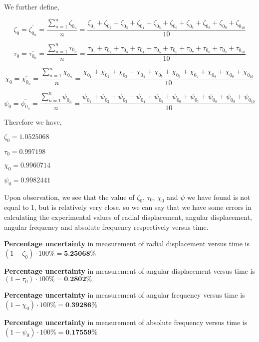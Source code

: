 {We further define,} 

    $$\zeta_0 = \overline{\zeta_{0_n}} = \frac{\sum_{n=1}^{n}\zeta_{0_n}}{n} = \frac{\zeta_{0_1} + \zeta_{0_2} + \zeta_{0_3} + \zeta_{0_4} + \zeta_{0_5} + \zeta_{0_6} + \zeta_{0_7} + \zeta_{0_8} + \zeta_{0_9} + \zeta_{0_{10}}}{10}$$
    
    $$\tau_0 = \overline{\tau_{0_n}} = \frac{\sum_{n=1}^{n}\tau_{0_n}}{n} = \frac{\tau_{0_1} + \tau_{0_2} + \tau_{0_3} + \tau_{0_4} + \tau_{0_5} + \tau_{0_6} + \tau_{0_7} + \tau_{0_8} + \tau_{0_9} + \tau_{0_{10}}}{10}$$
    
    $$\chi_0 = \overline{\chi_{0_n}} = \frac{\sum_{n=1}^{n}\chi_{0_n}}{n} = \frac{\chi_{0_1} + \chi_{0_2} + \chi_{0_3} + \chi_{0_4} + \chi_{0_5} + \chi_{0_6} + \chi_{0_7} + \chi_{0_8} + \chi_{0_9} + \chi_{0_{10}}}{10}$$
    
    $$\psi_0 = \overline{\psi_{0_n}} = \frac{\sum_{n=1}^{n}\psi_{0_n}}{n} = \frac{\psi_{0_1} + \psi_{0_2} + \psi_{0_3} + \psi_{0_4} + \psi_{0_5} + \psi_{0_6} + \psi_{0_7} + \psi_{0_8} + \psi_{0_9} + \psi_{0_{10}}}{10}$$

{Therefore we have,}

    $\zeta_0 = 1.0525068$
    
    $\tau_0 = 0.997198$
    
    $\chi_0 = 0.9960714$
    
    $\psi_0 = 0.9982441$

{Upon observation, we see that the value of $\zeta_0$, $\tau_0$, $\chi_0$ and $\psi$ we have found is not equal to 1, but is relatively very close, so we can say that we have some errors in calculating the experimental values of radial displacement, angular displacement, angular frequency and absolute frequency respectively versus time.}
        
        {\textbf{Percentage uncertainty} in measurement of radial displacement versus time is $(1-\zeta_0)\cdot{100\%}=\textbf{5.25068\%}$}
        
        {\textbf{Percentage uncertainty} in measurement of angular displacement versus time is $(1-\tau_0)\cdot{100\%}=\textbf{0.2802\%}$}
        
        {\textbf{Percentage uncertainty} in measurement of angular frequency versus time is $(1-\chi_0)\cdot{100\%}=\textbf{0.39286\%}$}
        
        {\textbf{Percentage uncertainty} in measurement of absolute frequency versus time is $(1-\psi_0)\cdot{100\%}=\textbf{0.17559\%}$}
        


